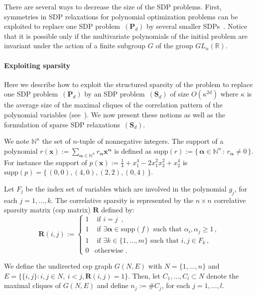 \documentclass[preprint]{sigplanconf}
\newcommand{\suppf}[1]{\text{supp}(#1)}
\newcommand{\mons}[2]{\N_{#1}^{#2}}
\newcommand{\R}{\mathbb{R}}
\newcommand{\N}{\mathbb{N}}
\newcommand{\x}{\mathbf{x}}
\newcommand{\alphab}{\boldsymbol{\alpha}}
\def\P{\mathbf{P}}
\def\S{\mathbf{S}}
\def\S{\mathbf{S}}
\theoremstyle{plain}
\begin{document}
There are several ways to decrease the size of the SDP problems. 
First, symmetries in SDP relaxations for polynomial optimization problems can be exploited to replace one SDP problem~$(\P_d)$ by
several smaller SDPs~\cite{Riener2013SymmetricSDP}. Notice that it is possible only if the multivariate polynomials of the initial problem are invariant under the action of a finite subgroup $G$ of the group $GL_{n}(\R)$. 
%

\paragraph{Exploiting sparsity} Here we describe how to exploit the structured sparsity of the
problem to replace one SDP problem~$(\P_d)$ by an SDP problem~$(\S_d)$ of
size $O (\kappa^ {2 d})$ where $\kappa$ is the average size
of the maximal cliques of the correlation pattern of the polynomial
variables (see~\cite{Waki06SparseSOS}). We now present these notions as well as the formulation of sparse SDP relaxations~$(\S_d)$.

We note $\N^n$ the set of $n$-tuple of nonnegative integers. The support of a polynomial $r(\x) := \sum_{\alphab \in \N^n} r_{\alphab} \x^{\alphab}$ is defined as $\suppf{r} := \{ \, \alphab \in \N^n \, : \, r_{\alphab} \neq 0 \, \}$. For instance the support of $p(\x) := \frac{1}{4} + x_1^4 - 2 x_1^2 x_2^2 + x_2^4$ is $\suppf{p} = \{ \, (0,0), (4, 0), (2,2), (0,4) \, \}$.

Let $F_j$ be the index set of variables which are involved in the polynomial $g_j$, for each $j=1, \dots, k$.
The correlative sparsity is represented by the 
$n \times n$ correlative sparsity matrix (csp matrix) $\mathbf{R}$ defined by:
\begin{equation*}
\label{eq:csp}
\mathbf{R}(i, j) := \left \{
\begin{array}{ll}
  1 & \text{ if }  i = j \enspace, \\
  1 & \text{ if }  \exists \alphab \in \suppf{f} \text{ such that } \alpha_i, \alpha_j \geq 1 \,, \\
  1 & \text{ if }  \exists k \in \{1, \dots, m\} \text{ such that } i, j \in F_k  \,,\\
  0 & \text{otherwise .} 
\end{array} \right.
\end{equation*}

We define the undirected csp graph $G(N, E)$ with
 $N = \{ 1, \dots, n \}$ and $E = \{\{i, j\} : i, j \in N , \ i < j , \mathbf{R}(i, j) = 1 \}$. 
Then, let $C_1,\dots, C_l \subset N$ denote the maximal cliques of $G(N, E)$ and 
 define $n_j := \#C_j$, for each $j=1 ,\dots,l$.
\end{document}
